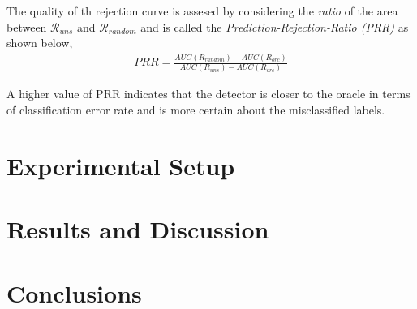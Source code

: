 \documentclass{article}
\begin{document}
The quality of th rejection curve is assesed by considering the \textit{ratio} of the area between $\mathcal{R}_{uns}$ and $\mathcal{R}_{random}$ and is called the \textit{Prediction-Rejection-Ratio (PRR)} as shown below,
\begin{align}
	PRR = \frac{AUC({R}_{random}) - AUC({R}_{orc})}{AUC({R}_{uns}) - AUC({R}_{orc})}
\end{align}

A higher value of PRR indicates that the detector is closer to the oracle in terms of classification error rate and is more certain about the misclassified labels.

\section{Experimental Setup}

\section{Results and Discussion}

\section{Conclusions}



\end{document}
